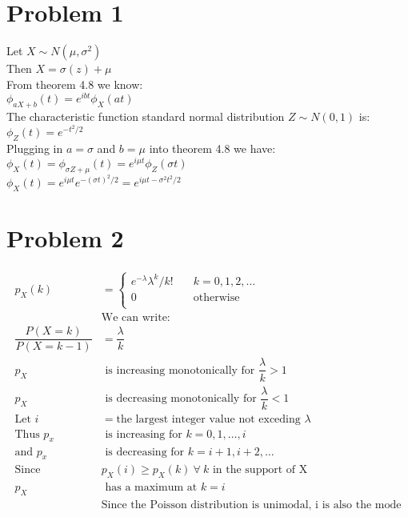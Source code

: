 \documentclass{article}
\begin{document}
\begin{flushleft}
\section*{Problem 1}
Let $X \sim N(\mu,\sigma^2)$\\
Then $X=\sigma(z)+\mu$\\
From theorem 4.8 we know:\\
$\phi_{aX+b}(t)=e^{ibt}\phi_X(at)$\\
The characteristic function standard normal distribution $Z\sim N(0,1)$ is:\\
$\phi_Z(t)=e^{-t^2/2}$\\
Plugging in $a=\sigma$ and $b=\mu$ into theorem 4.8 we have:\medbreak
$\phi_X(t)=\phi_{\sigma Z+\mu}(t)=e^{i\mu t}\phi_Z(\sigma t)$\\
$\phi_X(t)=e^{i\mu t}e^{-(\sigma t)^2/2}=e^{i\mu t-\sigma ^2 t^2/2}$
\section*{Problem 2}
\begin{align*}
p_X(k)&=\begin{cases}
e^{-\lambda}\lambda^k/k! \quad& k=0,1,2,\dots\\
0 \quad& \text{otherwise}\\
\end{cases}\\
&\text{We can write:}\\
\dfrac{P(X=k)}{P(X=k-1)}&=\dfrac{\lambda}{k}\\
p_X &\text{ is increasing monotonically for } \dfrac{\lambda}{k}>1\\
p_X &\text{ is decreasing monotonically for } \dfrac{\lambda}{k}<1\\
\text{Let } i&= \text{the largest integer value not exceding } \lambda\\
\text{Thus } p_x& \text{ is increasing for } k=0,1,\dots, i\\
\text{and } p_x& \text{ is decreasing for } k=i+1,i+2,\dots\\ 
\text{Since }& p_X(i)\geq p_X(k) \ \forall \ k \text{ in the support of X} \\
p_X &\text{ has a maximum at } k=i\\
&\text{Since the Poisson distribution is unimodal, i is also the mode} 
\end{align*}

\end{flushleft}
\end{document}
